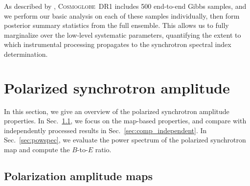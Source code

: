 \documentclass[twocolumn]{../../common/aa}
\def\WMAP{\emph{WMAP}}
\def\Planck{\emph{Planck}}
\newcommand{\cosmoglobe}{\textsc{Cosmoglobe}}
\newcommand{\K}[0]{\textit K}
\begin{document}
As described by \citet{watts2023_dr1}, \cosmoglobe\ DR1 includes 500 end-to-end Gibbs samples, and we perform our basic analysis on each of these samples individually, then form posterior summary statistics from the full ensemble. This allows us to fully marginalize over the low-level systematic parameters, quantifying the extent to which instrumental processing propagates to the synchrotron spectral index determination.


\section{Polarized synchrotron amplitude}
\label{sec:pol_amp}

In this section, we give an overview of the polarized synchrotron amplitude properties. In Sec.~\ref{sec:pol_amp_map}, we focus on the map-based properties, and compare with independently processed results in Sec.~\ref{sec:comp_independent}. In Sec.~\ref{sec:powspec},  we evaluate the power spectrum of the polarized synchrotron map and compute the $B$-to-$E$ ratio.

\subsection{Polarization amplitude maps}
\label{sec:pol_amp_map}



\end{document}
